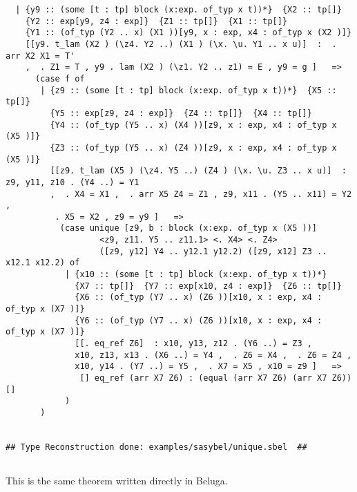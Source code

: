 \documentclass[12pt]{article}
\begin{document}
\begin{verbatim}
  | {y9 :: (some [t : tp] block (x:exp. of_typ x t))*}  {X2 :: tp[]}
    {Y2 :: exp[y9, z4 : exp]}  {Z1 :: tp[]}  {X1 :: tp[]}
    {Y1 :: (of_typ (Y2 .. x) (X1 ))[y9, x : exp, x4 : of_typ x (X2 )]}
    [[y9. t_lam (X2 ) (\z4. Y2 ..) (X1 ) (\x. \u. Y1 .. x u)]  :  . arr X2 X1 = T'
    ,  . Z1 = T , y9 . lam (X2 ) (\z1. Y2 .. z1) = E , y9 = g ]   =>
      (case f of
       | {z9 :: (some [t : tp] block (x:exp. of_typ x t))*}  {X5 :: tp[]}
         {Y5 :: exp[z9, z4 : exp]}  {Z4 :: tp[]}  {X4 :: tp[]}
         {Y4 :: (of_typ (Y5 .. x) (X4 ))[z9, x : exp, x4 : of_typ x (X5 )]}
         {Z3 :: (of_typ (Y5 .. x) (Z4 ))[z9, x : exp, x4 : of_typ x (X5 )]}
         [[z9. t_lam (X5 ) (\z4. Y5 ..) (Z4 ) (\x. \u. Z3 .. x u)]  : z9, y11, z10 . (Y4 ..) = Y1
         ,  . X4 = X1 ,  . arr X5 Z4 = Z1 , z9, x11 . (Y5 .. x11) = Y2 ,
          . X5 = X2 , z9 = y9 ]   =>
           (case unique [z9, b : block (x:exp. of_typ x (X5 ))]
                   <z9, z11. Y5 .. z11.1> <. X4> <. Z4>
                   ([z9, y12] Y4 .. y12.1 y12.2) ([z9, x12] Z3 .. x12.1 x12.2) of
            | {x10 :: (some [t : tp] block (x:exp. of_typ x t))*}
              {X7 :: tp[]}  {Y7 :: exp[x10, z4 : exp]}  {Z6 :: tp[]}
              {X6 :: (of_typ (Y7 .. x) (Z6 ))[x10, x : exp, x4 : of_typ x (X7 )]}
              {Y6 :: (of_typ (Y7 .. x) (Z6 ))[x10, x : exp, x4 : of_typ x (X7 )]}
              [[. eq_ref Z6]  : x10, y13, z12 . (Y6 ..) = Z3 ,
              x10, z13, x13 . (X6 ..) = Y4 ,  . Z6 = X4 ,  . Z6 = Z4 ,
              x10, y14 . (Y7 ..) = Y5 ,  . X7 = X5 , x10 = z9 ]   =>
               [] eq_ref (arr X7 Z6) : (equal (arr X7 Z6) (arr X7 Z6))[]
            )
       )


## Type Reconstruction done: examples/sasybel/unique.sbel  ##


\end{verbatim}
This is the same theorem written directly in \textmd{Beluga}.
\end{document}
